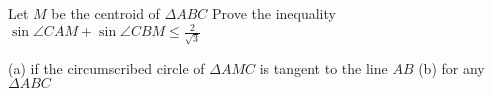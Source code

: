 Let $M$ be the centroid of $\Delta ABC$
Prove the inequality
$\sin \angle CAM + \sin\angle CBM \le \frac{2}{\sqrt 3}$

(a) if the circumscribed circle of $\Delta AMC$ is tangent to the line $AB$
(b) for any $\Delta ABC$